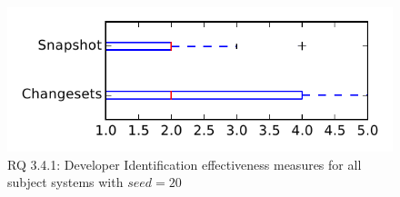 
\begin{figure}
\centering
\includegraphics[height=0.4\textheight]{figures/dit_seed/rq1_tiny_20}
\caption{RQ 3.4.1: Developer Identification effectiveness measures for all subject systems with $seed=20$}
\label{fig:dit_seed:rq1:tiny}
\end{figure}
